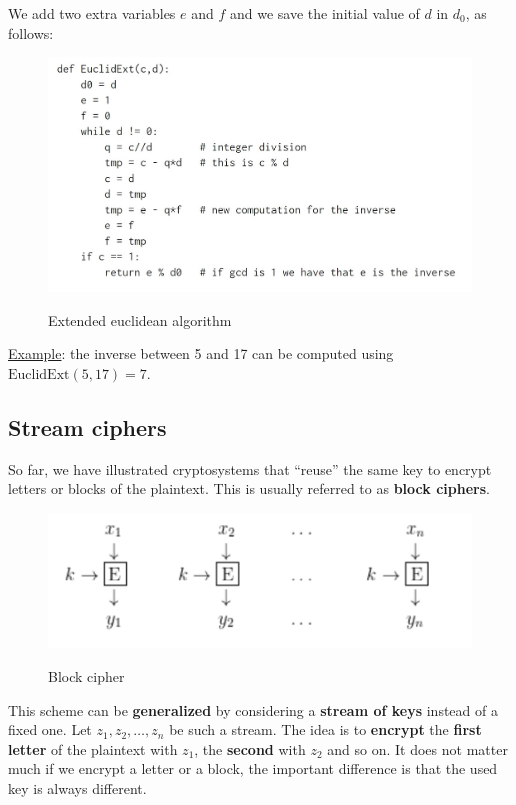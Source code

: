 We add two extra variables $e$ and $f$ and we save the initial value of $d$ in $d_0$, as follows:

\begin{figure}[h!]
        \centering
        \includegraphics[scale = 0.9]{img/eu2.jpg}
        \label{eu2}
        \caption{Extended euclidean algorithm}
\end{figure}

\underline{Example}: the inverse between 5 and 17 can be computed using $\text{EuclidExt}(5,17) = 7$.

\subsection{Stream ciphers}
So far, we have illustrated cryptosystems that “reuse” the same key to encrypt letters or blocks of the plaintext. This is usually referred to as \textbf{block ciphers}.

\begin{figure}[h!]
        \centering
        \includegraphics[scale = 1.0]{img/stream1.png}
        \label{stream1}
        \caption{Block cipher}
\end{figure}

This scheme can be \textbf{generalized} by considering a \textbf{stream of keys} instead of a fixed one. Let $z_1, z_2, \ldots, z_n$ be such a stream. The idea is to \textbf{encrypt} the \textbf{first letter} of the plaintext with $z_1$, the \textbf{second} with $z_2$ and so on. It does not matter much if we encrypt a letter or a block, the important difference is that the used key is always different.

